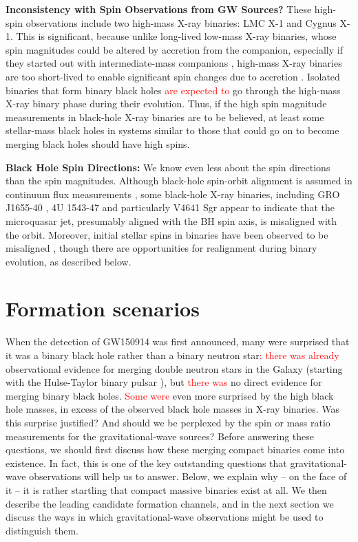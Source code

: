 \documentclass[iop,onecolumn]{revtex4}
\newcommand{\ajf}[1]{\textcolor{red}{#1}}
\begin{document}
\textbf{Inconsistency with Spin Observations from GW Sources?} These high-spin observations include two high-mass X-ray binaries: LMC X-1 and Cygnus X-1.  This is significant, because unlike long-lived low-mass X-ray binaries, whose spin magnitudes could be altered by accretion from the companion, especially if they started out with intermediate-mass companions \citep{Podsiadlowski:2003,Fragos:2015}, high-mass X-ray binaries are too short-lived to enable significant spin changes due to accretion \citep{KingKolb:1999}.  %
Isolated binaries that form binary black holes \ajf{are expected to} go through the high-mass X-ray binary phase during their evolution.  Thus, if the high spin magnitude measurements in black-hole X-ray binaries are to be believed, at least some stellar-mass black holes in systems similar to those that could go on to become merging black holes should have high spins.  

\textbf{Black Hole Spin Directions:} We know even less about the spin directions than the spin magnitudes.  Although black-hole spin-orbit alignment is assumed in continuum flux measurements \citep{MillerMiller:2015}, some black-hole X-ray binaries, including GRO J1655-40 \citep{Martin:2008}, 4U 1543-47 \citep{MorningstarMiller:2014} and particularly V4641 Sgr \citep{Orosz:2001,Martin:2008b} appear to indicate that the microquasar jet, presumably aligned with the BH spin axis, is misaligned with the orbit.  Moreover, initial stellar spins in binaries have been observed to be misaligned \citep[e.g.,][]{Albrecht:2009,Albrecht:2014}, though there are opportunities for realignment during binary evolution, as described below.

\section{Formation scenarios}\label{form}

When the detection of GW150914 was first announced, many were surprised that it was a binary black hole rather than a binary neutron star\ajf{: there was already} observational evidence for merging double neutron stars in the Galaxy (starting with the Hulse-Taylor binary pulsar \citep{HulseTaylor:1975}), but \ajf{there was} no direct evidence for merging binary black holes. \ajf{Some were} even more surprised by the high black hole masses, in excess of the observed black hole masses in X-ray binaries. Was this surprise justified? And should we be perplexed by the spin or mass ratio measurements for the gravitational-wave sources? Before answering these questions, we should first discuss how these merging compact binaries come into existence. In fact, this is one of the key outstanding questions that gravitational-wave observations will help us to answer. Below, we explain why -- on the face of it -- it is rather startling that compact massive binaries exist at all. We then describe the leading candidate formation channels, and in the next section we discuss the ways in which gravitational-wave observations might be used to distinguish them.
\end{document}
